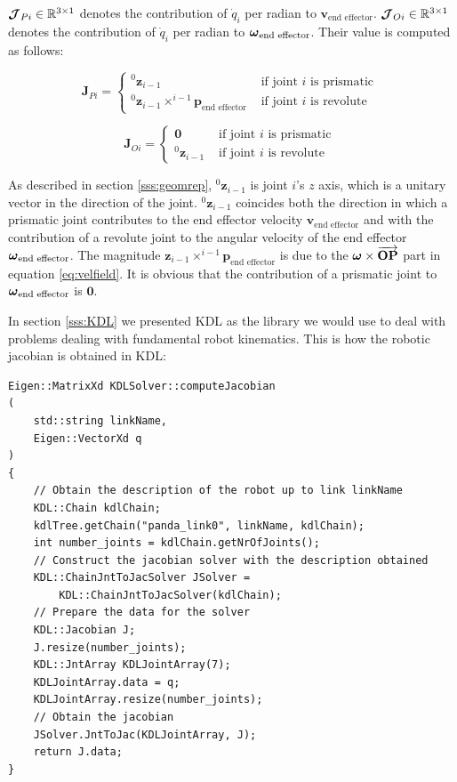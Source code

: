$\mbox{\boldmath$\mathcal{J}$}_{Pi} \in \mathbb{R}^{3 \times 1}$ denotes the contribution of $\dot{q}_i$ per radian to $\mathbf{v}_{\text{end effector}}$. $\mbox{\boldmath$\mathcal{J}$}_{Oi} \in \mathbb{R}^{3 \times 1}$ denotes the contribution of $\dot{q}_i$ per radian to $\mbox{\boldmath$\omega$}_{\text{end effector}}$. Their value is computed as follows:

$$
\boldsymbol{J}_{P i}=\left\{\begin{array}{ll}
^{0}\mathbf{z}_{i-1} & \text { if joint } i \text { is prismatic } \\
^{0}\mathbf{z}_{i-1} \times ^{i-1}\boldsymbol{p}_{\text{end effector}} & \text { if joint } i \text { is revolute }
\end{array}\right.
$$

$$
\boldsymbol{J}_{O i}=\left\{\begin{array}{ll}
\mathbf{0} & \text { if joint } i \text { is prismatic } \\
^{0}\mathbf{z}_{i-1} & \text { if joint } i \text { is revolute }
\end{array}\right.
$$

As described in section \ref{sss:geomrep}, $^{0}\mathbf{z}_{i-1}$ is joint $i$'s $z$ axis, which is a unitary vector in the direction of the joint. $^{0}\mathbf{z}_{i-1}$ coincides both the direction in which a prismatic joint contributes to the end effector velocity $\mathbf{v}_{\text{end effector}}$ and with the contribution of a revolute joint to the angular velocity of the end effector $\mbox{\boldmath$\omega$}_{\text{end effector}}$. The magnitude $\mathbf{z}_{i-1} \times ^{i-1}\boldsymbol{p}_{\text{end effector}}$ is due to the $\mbox{\boldmath$\omega$} \times \overrightarrow{\mathbf{OP}}$ part in equation \ref{eq:velfield}. It is obvious that the contribution of a prismatic joint to $\mbox{\boldmath$\omega$}_{\text{end effector}}$ is $\mathbf{0}$.

In section \ref{sss:KDL} we presented KDL as the library we would use to deal with problems dealing with fundamental robot kinematics. This is how the robotic jacobian is obtained in KDL:

\begin{lstlisting}[caption={Implementation of the function \lstinline{computeJacobian}.},captionpos=b]
Eigen::MatrixXd KDLSolver::computeJacobian
(
    std::string linkName,
    Eigen::VectorXd q
)
{
    // Obtain the description of the robot up to link linkName
    KDL::Chain kdlChain;
    kdlTree.getChain("panda_link0", linkName, kdlChain);
    int number_joints = kdlChain.getNrOfJoints();
    // Construct the jacobian solver with the description obtained
    KDL::ChainJntToJacSolver JSolver =
        KDL::ChainJntToJacSolver(kdlChain);
    // Prepare the data for the solver
    KDL::Jacobian J;
    J.resize(number_joints);
    KDL::JntArray KDLJointArray(7);
    KDLJointArray.data = q;
    KDLJointArray.resize(number_joints);
    // Obtain the jacobian
    JSolver.JntToJac(KDLJointArray, J);
    return J.data;
}
\end{lstlisting}


